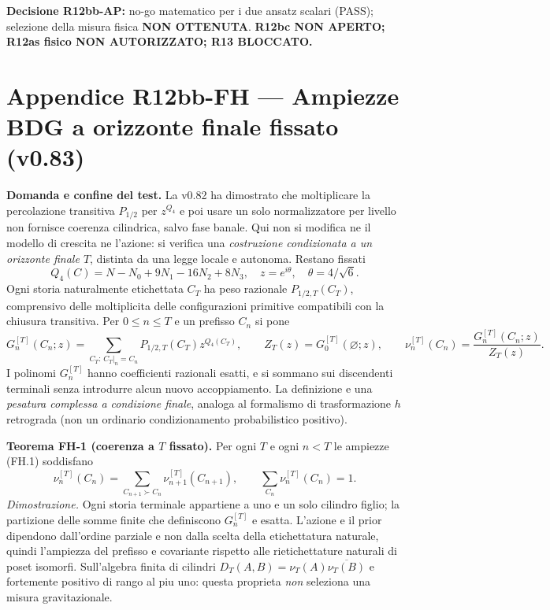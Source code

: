 \documentclass[11pt,a4paper]{article}
\begin{document}
\textbf{Decisione R12bb-AP:} no-go matematico per i due ansatz scalari (PASS); selezione della misura fisica \textbf{NON OTTENUTA}. \textbf{R12bc NON APERTO; R12as fisico NON AUTORIZZATO; R13 BLOCCATO.}

\clearpage
\section*{Appendice R12bb-FH --- Ampiezze BDG a orizzonte finale fissato (v0.83)}
\textbf{Domanda e confine del test.} La v0.82 ha dimostrato che moltiplicare la percolazione transitiva $P_{1/2}$ per $z^{Q_4}$ e poi usare un solo normalizzatore per livello non fornisce coerenza cilindrica, salvo fase banale. Qui non si modifica ne il modello di crescita ne l'azione: si verifica una \emph{costruzione condizionata a un orizzonte finale $T$}, distinta da una legge locale e autonoma. Restano fissati
\[
 Q_4(C)=N-N_0+9N_1-16N_2+8N_3,\quad
 z=e^{i\theta},\quad \theta=4/\sqrt6.
\]
Ogni storia naturalmente etichettata $C_T$ ha peso razionale $P_{1/2,T}(C_T)$, comprensivo delle moltiplicita delle configurazioni primitive compatibili con la chiusura transitiva. Per $0\le n\le T$ e un prefisso $C_n$ si pone
\begin{equation}
 G_n^{[T]}(C_n;z)=\sum_{C_T:\,C_T|_n=C_n}P_{1/2,T}(C_T)z^{Q_4(C_T)},\qquad
 Z_T(z)=G_0^{[T]}(\varnothing;z),\qquad
 \nu_n^{[T]}(C_n)=\frac{G_n^{[T]}(C_n;z)}{Z_T(z)}.\tag{FH.1}
\end{equation}
I polinomi $G_n^{[T]}$ hanno coefficienti razionali esatti, e si sommano sui discendenti terminali senza introdurre alcun nuovo accoppiamento. La definizione e una \emph{pesatura complessa a condizione finale}, analoga al formalismo di trasformazione $h$ retrograda (non un ordinario condizionamento probabilistico positivo).

\textbf{Teorema FH-1 (coerenza a $T$ fissato).} Per ogni $T$ e ogni $n<T$ le ampiezze (FH.1) soddisfano
\begin{equation}
 \nu_n^{[T]}(C_n)=\sum_{C_{n+1}\succ C_n}\nu_{n+1}^{[T]}(C_{n+1}),\qquad
 \sum_{C_n}\nu_n^{[T]}(C_n)=1.\tag{FH.2}
\end{equation}
\emph{Dimostrazione.} Ogni storia terminale appartiene a uno e un solo cilindro figlio; la partizione delle somme finite che definiscono $G_n^{[T]}$ e esatta. L'azione e il prior dipendono dall'ordine parziale e non dalla scelta della etichettatura naturale, quindi l'ampiezza del prefisso e covariante rispetto alle rietichettature naturali di poset isomorfi. Sull'algebra finita di cilindri $D_T(A,B)=\nu_T(A)\overline{\nu_T(B)}$ e fortemente positivo di rango al piu uno: questa proprieta \emph{non} seleziona una misura gravitazionale.
\end{document}
